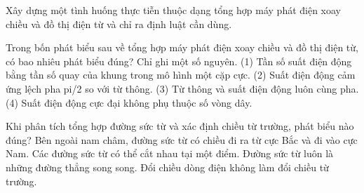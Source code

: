 \begin{bt}
Xây dựng một tình huống thực tiễn thuộc dạng tổng hợp máy phát điện xoay chiều và đồ thị điện từ và chỉ ra định luật cần dùng.
\end{bt}

\begin{ex}
Trong bốn phát biểu sau về tổng hợp máy phát điện xoay chiều và đồ thị điện từ, có bao nhiêu phát biểu đúng? Chỉ ghi một số nguyên. (1) Tần số suất điện động bằng tần số quay của khung trong mô hình một cặp cực. (2) Suất điện động cảm ứng lệch pha pi/2 so với từ thông. (3) Từ thông và suất điện động luôn cùng pha. (4) Suất điện động cực đại không phụ thuộc số vòng dây.
\end{ex}

\begin{ex}
Khi phân tích tổng hợp đường sức từ và xác định chiều từ trường, phát biểu nào đúng?
\choice
{\True Bên ngoài nam châm, đường sức từ có chiều đi ra từ cực Bắc và đi vào cực Nam.}
{Các đường sức từ có thể cắt nhau tại một điểm.}
{Đường sức từ luôn là những đường thẳng song song.}
{Đổi chiều dòng điện không làm đổi chiều từ trường.}
\end{ex}

